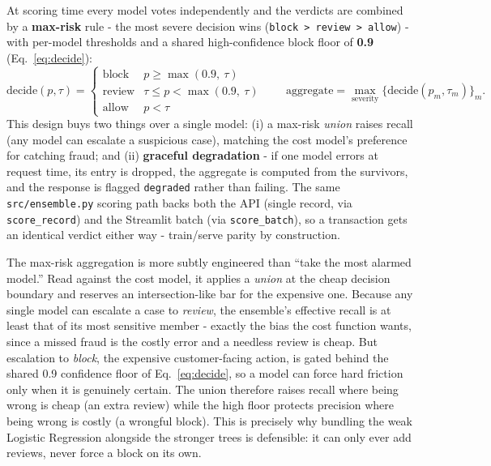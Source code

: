 \documentclass[11pt,a4paper]{report}
\newcommand{\code}[1]{\texttt{\small #1}}
\begin{document}
At scoring time every model votes independently and the verdicts are combined by a
\textbf{max-risk} rule - the most severe decision wins (\code{block > review > allow}) - with
per-model thresholds and a shared high-confidence block floor of \textbf{0.9}
(Eq.~\ref{eq:decide}):
\begin{equation}
\label{eq:decide}
\text{decide}(p, \tau) =
\begin{cases}
\text{block} & p \ge \max(0.9,\ \tau)\\
\text{review} & \tau \le p < \max(0.9,\ \tau)\\
\text{allow} & p < \tau
\end{cases}
\qquad
\text{aggregate} = \max_{\text{severity}} \{\text{decide}(p_m,\tau_m)\}_m .
\end{equation}
This design buys two things over a single model: (i) a max-risk \emph{union} raises recall
(any model can escalate a suspicious case), matching the cost model's preference for catching
fraud; and (ii) \textbf{graceful degradation} - if one model errors at request time, its
entry is dropped, the aggregate is computed from the survivors, and the response is flagged
\code{degraded} rather than failing. The same \code{src/ensemble.py} scoring path backs both
the API (single record, via \code{score\_record}) and the Streamlit batch (via
\code{score\_batch}), so a transaction gets an identical verdict either way - train/serve
parity by construction.

The max-risk aggregation is more subtly engineered than ``take the most alarmed model.'' Read against the cost model, it applies a \emph{union} at the cheap decision boundary and reserves an intersection-like bar for the expensive one. Because any single model can escalate a case to \emph{review}, the ensemble's effective recall is at least that of its most sensitive member - exactly the bias the cost function wants, since a missed fraud is the costly error and a needless review is cheap. But escalation to \emph{block}, the expensive customer-facing action, is gated behind the shared 0.9 confidence floor of Eq.~\eqref{eq:decide}, so a model can force hard friction only when it is genuinely certain. The union therefore raises recall where being wrong is cheap (an extra review) while the high floor protects precision where being wrong is costly (a wrongful block). This is precisely why bundling the weak Logistic Regression alongside the stronger trees is defensible: it can only ever add reviews, never force a block on its own.
\end{document}
